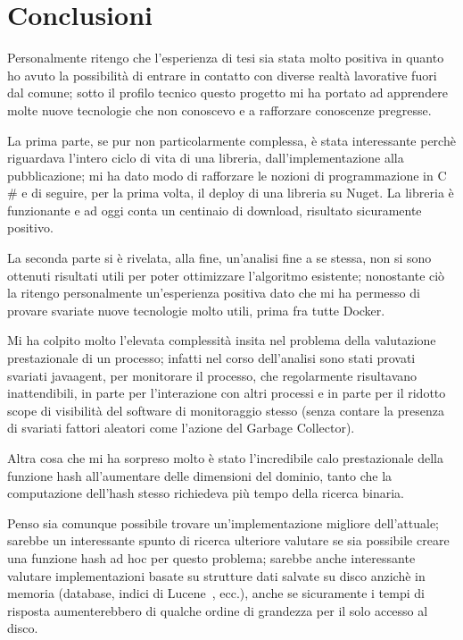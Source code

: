 \chapter{Conclusioni}
Personalmente ritengo che l'esperienza di tesi sia stata molto positiva in quanto ho avuto la possibilità di entrare in contatto con diverse realtà lavorative fuori dal comune; 
sotto il profilo tecnico questo progetto mi ha portato ad apprendere molte nuove tecnologie che non conoscevo e a rafforzare conoscenze pregresse.

La prima parte, se pur non particolarmente complessa, è stata interessante perchè riguardava l'intero ciclo di vita di una libreria, dall'implementazione alla pubblicazione;
mi ha dato modo di rafforzare le nozioni di programmazione in C$\#$ e di seguire, per la prima volta, il deploy di una libreria su Nuget. 
La libreria è funzionante e ad oggi conta un centinaio di download, risultato sicuramente positivo.

La seconda parte si è rivelata, alla fine, un'analisi fine a se stessa, non si sono ottenuti risultati utili per poter ottimizzare l'algoritmo esistente;
nonostante ciò la ritengo personalmente un'esperienza positiva dato che mi ha permesso di provare svariate nuove tecnologie molto utili, prima fra tutte Docker. 

Mi ha colpito molto l'elevata complessità insita nel problema della valutazione prestazionale di un processo; 
infatti nel corso dell'analisi sono stati provati svariati javaagent, per monitorare il processo, che regolarmente risultavano inattendibili, 
in parte per l'interazione con altri processi e in parte per il ridotto scope di visibilità del software di monitoraggio stesso 
(senza contare la presenza di svariati fattori aleatori come l'azione del Garbage Collector).

Altra cosa che mi ha sorpreso molto è stato l'incredibile calo prestazionale della funzione hash all'aumentare delle dimensioni del dominio, tanto che la computazione dell'hash stesso 
richiedeva più tempo della ricerca binaria.

Penso sia comunque possibile trovare un'implementazione migliore dell'attuale; sarebbe un interessante spunto di ricerca ulteriore valutare se sia possibile creare una 
funzione hash ad hoc per questo problema; sarebbe anche interessante valutare implementazioni basate su strutture dati salvate su disco anzichè in memoria 
(database, indici di Lucene~\cite{lucene}, ecc.), anche se sicuramente i tempi di risposta aumenterebbero di qualche ordine di grandezza per il solo accesso al disco. 

